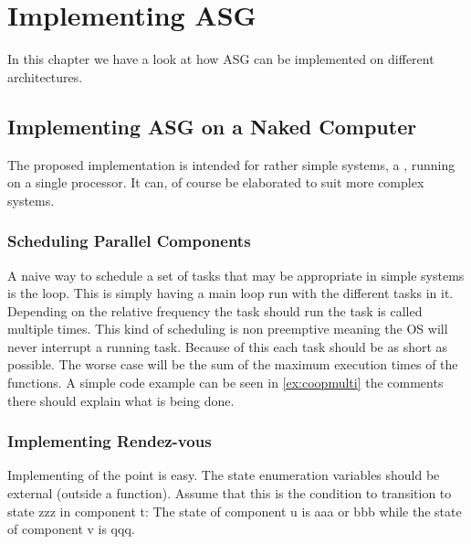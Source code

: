 \documentclass[../main.tex]{subfiles}
\begin{document}
\chapter{Implementing ASG}
In this chapter we have a look at how ASG can be implemented on different architectures.

\section{Implementing ASG on a Naked Computer}
The proposed implementation is intended for rather simple systems, a , running on a single processor. It can, of course be elaborated to suit more complex systems.
\subsection{Scheduling Parallel Components}
A naive way to schedule a set of tasks that may be appropriate in simple systems is the  loop.
This is simply having a main loop run with the different tasks in it.
Depending on the relative frequency the task should run the task is called multiple times.
This kind of scheduling is non preemptive meaning the OS will never interrupt a running task.
Because of this each task should be as short as possible.
The worse case  will be the sum of the maximum execution times of the functions.
A simple code example can be seen in \ref{ex:coopmulti} the comments there should explain what is being done.

%

\subsection{Implementing Rendez-vous}
Implementing of the  point is easy.
The state enumeration variables should be external (outside a function).
Assume that this is the condition to transition to state zzz in component t:
The state of component u is aaa or bbb while the state of component v is qqq.
\end{document}
